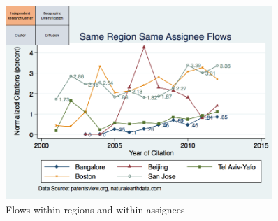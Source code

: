 \documentclass[10pt,letterpaper]{article}
\begin{document}
\begin{figure}[h!]
\begin{centering}
  \includegraphics[width=0.90\textwidth]{SMSSameRegionSameAssigneeFlows}
  \caption{Flows within regions and within assignees}
  \label{fig:SMSSameRegionSameAssigneeFlows}
\end{centering}
\end{figure}
\end{document}
